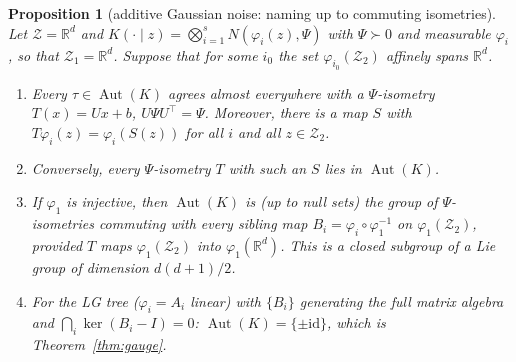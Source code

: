 \documentclass[11pt]{article}
\newtheorem{proposition}[theorem]{Proposition}
\theoremstyle{definition}
\newcommand{\R}{\mathbb R}
\begin{document}
\begin{proposition}[additive Gaussian noise: naming up to commuting isometries]\label{prop:gaussaut}
Let $\mathcal Z=\R^d$ and $K(\cdot\mid z)=\bigotimes_{i=1}^sN(\varphi_i(z),\Psi)$ with $\Psi\succ0$ and
measurable $\varphi_i$, so that $\mathcal Z_1=\R^d$. Suppose that for some $i_0$ the set
$\varphi_{i_0}(\mathcal Z_2)$ affinely spans $\R^d$.
\begin{enumerate}
\item Every $\tau\in\operatorname{Aut}(K)$ agrees almost everywhere with a \emph{$\Psi$-isometry}
$T(x)=Ux+b$, $U\Psi U^{\!\top}=\Psi$. Moreover, there is a map $S$ with $T\varphi_i(z)=\varphi_i(S(z))$
for all $i$ and all $z\in\mathcal Z_2$.
\item Conversely, every $\Psi$-isometry $T$ with such an $S$ lies in $\operatorname{Aut}(K)$.
\item If $\varphi_1$ is injective, then $\operatorname{Aut}(K)$ is (up to null sets) the group of
$\Psi$-isometries commuting with every \emph{sibling map} $B_i=\varphi_i\circ\varphi_1^{-1}$ on
$\varphi_1(\mathcal Z_2)$, provided $T$ maps $\varphi_1(\mathcal Z_2)$ into $\varphi_1(\R^d)$. This is a
closed subgroup of a Lie group of dimension $d(d+1)/2$.
\item For the LG tree ($\varphi_i=A_i$ linear) with $\{B_i\}$ generating the full matrix algebra and
$\bigcap_i\ker(B_i-I)=0$: $\operatorname{Aut}(K)=\{\pm\mathrm{id}\}$, which is Theorem~\ref{thm:gauge}.
\end{enumerate}
\end{proposition}
\end{document}
